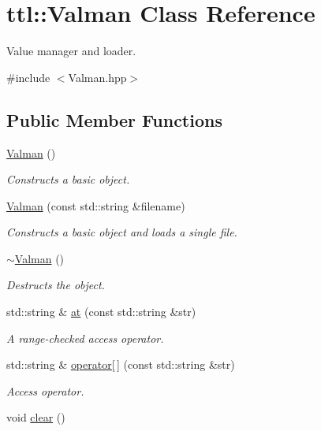 \hypertarget{classttl_1_1_valman}{\section{ttl\-:\-:Valman Class Reference}
\label{classttl_1_1_valman}
}


Value manager and loader.  




{\ttfamily \#include $<$Valman.\-hpp$>$}

\subsection*{Public Member Functions}
\begin{DoxyCompactItemize}
\item 
\hypertarget{classttl_1_1_valman_a6ab23b3471a7510cd31da0f2c660d570}{\hyperlink{classttl_1_1_valman_a6ab23b3471a7510cd31da0f2c660d570}{Valman} ()}\label{classttl_1_1_valman_a6ab23b3471a7510cd31da0f2c660d570}

\begin{DoxyCompactList}\small\item\em Constructs a basic object. \end{DoxyCompactList}\item 
\hyperlink{classttl_1_1_valman_a69ddad1137e1afe2323ee952d6a9f6a9}{Valman} (const std\-::string \&filename)
\begin{DoxyCompactList}\small\item\em Constructs a basic object and loads a single file. \end{DoxyCompactList}\item 
\hypertarget{classttl_1_1_valman_ad0b5383377f9a28a415a874790169c1e}{\hyperlink{classttl_1_1_valman_ad0b5383377f9a28a415a874790169c1e}{$\sim$\-Valman} ()}\label{classttl_1_1_valman_ad0b5383377f9a28a415a874790169c1e}

\begin{DoxyCompactList}\small\item\em Destructs the object. \end{DoxyCompactList}\item 
std\-::string \& \hyperlink{classttl_1_1_valman_a95135c0345df5feb38e510581d994456}{at} (const std\-::string \&str)
\begin{DoxyCompactList}\small\item\em A range-\/checked access operator. \end{DoxyCompactList}\item 
std\-::string \& \hyperlink{classttl_1_1_valman_a50f0de1ab7d768fc493217152234176c}{operator\mbox{[}$\,$\mbox{]}} (const std\-::string \&str)
\begin{DoxyCompactList}\small\item\em Access operator. \end{DoxyCompactList}\item 
\hypertarget{classttl_1_1_valman_a4d0d3d70b3d099bd27a153742ea29bc7}{void \hyperlink{classttl_1_1_valman_a4d0d3d70b3d099bd27a153742ea29bc7}{clear} ()}\label{classttl_1_1_valman_a4d0d3d70b3d099bd27a153742ea29bc7}


\end{DoxyCompactItemize}
